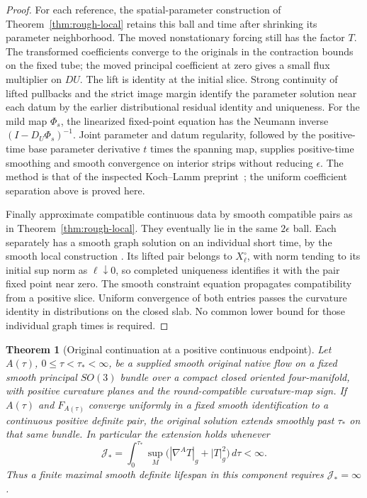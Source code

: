 \documentclass[11pt]{article}
\numberwithin{equation}{section}
\newtheorem{theorem}{Theorem}[section]
\theoremstyle{definition}
\theoremstyle{remark}
\begin{document}
\begin{proof}
For each reference, the spatial-parameter construction
of Theorem~\ref{thm:rough-local} retains this ball and
time after shrinking its parameter neighborhood.
The moved nonstationary forcing still has the factor
\(T\). The transformed coefficients converge to the
originals in the contraction bounds on the fixed tube;
the moved principal coefficient at zero gives a small
flux multiplier on \(DU\). The lift is identity at
the initial slice. Strong continuity of lifted pullbacks and the
strict image margin identify the parameter solution
near each datum by the earlier distributional residual
identity and uniqueness. For the mild map \(\Phi_s\), the
linearized fixed-point equation has the Neumann inverse
\((I-D_U\Phi_s)^{-1}\). Joint parameter and
datum regularity, followed by the positive-time base
parameter derivative \(t\) times the spanning map, supplies
positive-time smoothing and smooth convergence on
interior strips without reducing \(\epsilon\).
The method is that of the inspected Koch--Lamm
preprint~\cite[Sections 2--4]{KochLamm2015}; the uniform
coefficient separation above is proved here.

Finally approximate compatible continuous data by smooth
compatible pairs as in Theorem~\ref{thm:rough-local}.
They eventually lie in the same \(2\epsilon\) ball.
Each separately has a smooth graph solution on an
individual short time, by the smooth local construction
\cite[Section 7.3 of the inspected text]{Taylor1991Nonlinear}.
Its lifted pair belongs to \(X_\ell^\circ\), with
norm tending to its initial sup norm as \(\ell\downarrow0\),
so completed uniqueness identifies it with the pair
fixed point near zero. The smooth constraint equation
propagates compatibility from a positive slice.
Uniform convergence of both entries passes the
curvature identity in distributions on the closed slab.
No common lower bound for those individual graph times
is required.
\end{proof}

\begin{theorem}[Original continuation at a positive continuous endpoint]
\label{thm:original-positive-endpoint}
Let \(A(\tau)\), \(0\le\tau<\tau_*<\infty\), be a
supplied smooth original native flow on a fixed smooth
principal \(SO(3)\) bundle over a compact closed oriented
four-manifold, with positive curvature planes and the
round-compatible curvature-map sign.
If \(A(\tau)\) and \(F_{A(\tau)}\) converge uniformly
in a fixed smooth identification to a continuous
positive definite pair, the original solution extends
smoothly past \(\tau_*\) on that same bundle.
In particular the extension holds whenever
\[
 \mathcal J_*=\int_0^{\tau_*}
      \sup_M\bigl(|\nabla^AT|_g+|T|_g^2\bigr)\,d\tau<\infty.
\]
Thus a finite maximal smooth definite lifespan in this
component requires \(\mathcal J_*=\infty\).
\end{theorem}
\end{document}

